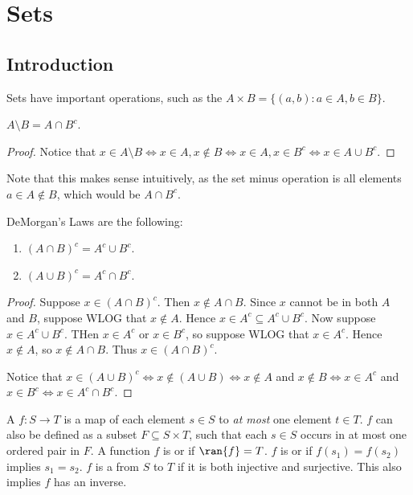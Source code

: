 \chapter{Sets}
\section{Introduction}
Sets have important operations, such as the  $A \times B = \{ (a,b) : a \in A, b \in B \}$. 
\begin{proposition*}
$A \setminus B = A \cap B^c$. 
\end{proposition*}
\begin{proof}
	Notice that $x \in A\setminus B \Leftrightarrow x \in A, x \notin B \Leftrightarrow x \in A, x \in B^c \Leftrightarrow x \in A \cup B^c$. 
\end{proof}
Note that this makes sense intuitively, as the set minus operation is all elements $a \in A \notin B$, which would be $A \cap B^c$.
\begin{theorem} 
DeMorgan's Laws are the following:
\begin{enumerate}
\item $(A \cap B)^c = A^c \cup B^c$. 
\item $(A \cup B)^c = A^c \cap B^c$.
\end{enumerate} 
\end{theorem}
\begin{proof}
	Suppose $x \in (A\cap B)^c$. Then $x \notin A \cap B$. Since $x$ cannot be in both $A$ and $B$, suppose WLOG that $x\notin A$. Hence $x \in A^c \subseteq A^c \cup B^c$. Now suppose $x \in A^c \cup B^c$. THen $x \in A^c$ or $x \in B^c$, so suppose WLOG that $x \in A^c$. Hence $x \notin A$, so $x \notin A\cap B$. Thus $x \in (A\cap B)^c$. 

	Notice that $x \in (A\cup B)^c \Leftrightarrow x \notin (A\cup B) \Leftrightarrow x\notin A$ and $x \notin B \Leftrightarrow x \in A^c$ and $x \in B^c \Leftrightarrow x \in A^c \cap B^c$.
\end{proof}

\begin{definition}
A  $f: S \longrightarrow T$ is a map of each element $s \in S$ to \emph{at most} one element $t \in T$. $f$ can also be defined as a subset $F \subseteq S \times T$, such that each $s \in S$ occurs in at most one ordered pair in $F$. A function $f$ is  or  if $\ran{f} = T$. $f$ is  or  if $f(s_1) = f(s_2)$ implies $s_1 = s_2$. $f$ is a  from $S$ to $T$ if it is both injective and surjective. This also implies $f$ has an inverse. 
\end{definition}

